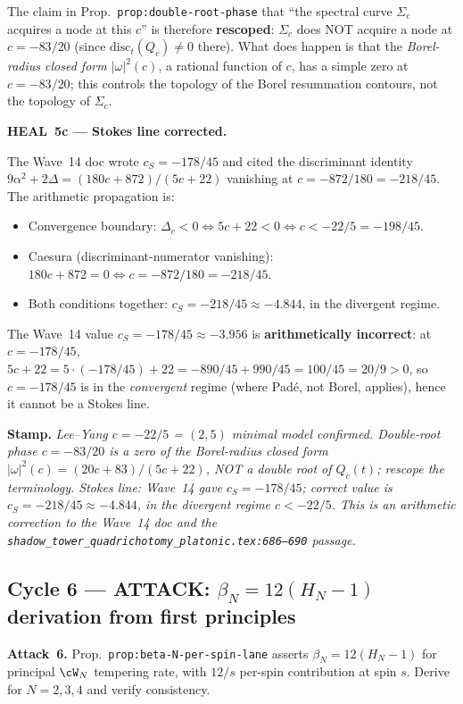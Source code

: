 The claim in Prop.~\texttt{prop:double-root-phase} that ``the spectral
curve $\Sigma_c$ acquires a node at this $c$'' is therefore
\textbf{rescoped}: $\Sigma_c$ does NOT acquire a node at $c = -83/20$
(since $\mathrm{disc}_t(Q_c) \ne 0$ there). What does happen is that the
\emph{Borel-radius closed form $|\omega|^2(c)$}, a rational function of
$c$, has a simple zero at $c = -83/20$; this controls the topology of
the Borel resummation contours, not the topology of $\Sigma_c$.

\textbf{HEAL~5c --- Stokes line corrected.}

The Wave~14 doc wrote $c_S = -178/45$ and cited the discriminant identity
$9\alpha^2 + 2\Delta = (180c + 872)/(5c+22)$ vanishing at
$c = -872/180 = -218/45$. The arithmetic propagation is:
\begin{itemize}
\item Convergence boundary: $\Delta_c < 0 \iff 5c+22 < 0 \iff c < -22/5 = -198/45$.
\item Caesura (discriminant-numerator vanishing): $180c + 872 = 0
  \iff c = -872/180 = -218/45$.
\item Both conditions together: $c_S = -218/45 \approx -4.844$, in the
  divergent regime.
\end{itemize}

The Wave~14 value $c_S = -178/45 \approx -3.956$ is \textbf{arithmetically
incorrect}: at $c = -178/45$, $5c + 22 = 5 \cdot (-178/45) + 22 =
-890/45 + 990/45 = 100/45 = 20/9 > 0$, so $c = -178/45$ is in the
\emph{convergent} regime (where Pad\'e, not Borel, applies), hence it
cannot be a Stokes line.

\textbf{Stamp.} \emph{Lee--Yang $c = -22/5$ = $(2,5)$ minimal model
confirmed. Double-root phase $c = -83/20$ is a zero of the Borel-radius
closed form $|\omega|^2(c) = (20c+83)/(5c+22)$, NOT a double root of
$Q_c(t)$; rescope the terminology. Stokes line: Wave~14 gave
$c_S = -178/45$; correct value is $c_S = -218/45 \approx -4.844$, in the
divergent regime $c < -22/5$. This is an arithmetic correction to the
Wave~14 doc and the
\texttt{shadow\_tower\_quadrichotomy\_platonic.tex:686--690} passage.}

\subsection*{Cycle 6 --- ATTACK: $\beta_N = 12(H_N - 1)$ derivation from first principles}

\textbf{Attack~6.} Prop.~\texttt{prop:beta-N-per-spin-lane} asserts
$\beta_N = 12(H_N - 1)$ for principal $\cW_N$ tempering rate, with
$12/s$ per-spin contribution at spin $s$. Derive for $N = 2, 3, 4$ and
verify consistency.

